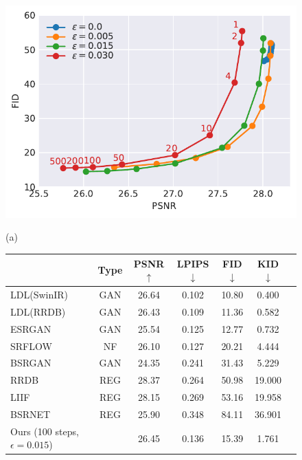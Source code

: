 

\begin{figure}[ht]

\begin{minipage}[c]{.38\linewidth}
\centering
    \includegraphics[width=\linewidth, clip=true, trim=5 0 0 0]{assets/pd_curve_sisrx4_fid_noise.pdf}\vspace{-.3em}

(a)
\end{minipage}
\begin{minipage}[c]{.61\linewidth}
\small
\centering
\setlength{\tabcolsep}{1pt}
\begin{tabular}{lcccccr}
\toprule
& Type & PSNR$\uparrow$ & LPIPS$\downarrow$ & FID$\downarrow$ & KID$\downarrow$ \\ \midrule
LDL(SwinIR)~\citep{liang2022details} & GAN	& 26.64	&	\colorbox{red!15}{0.102}	& \colorbox{red!15}{10.80} & \colorbox{red!15}{0.400} \\
LDL(RRDB)~\citep{liang2022details} & GAN &	26.43	&	\colorbox{blue!15}{0.109}	& \colorbox{blue!15}{11.36} & \colorbox{blue!15}{0.582}\\
ESRGAN~\citep{wang2018esrgan}	& GAN & 25.54	&	0.125	& 12.77 & 0.732	 \\
SRFLOW~\citep{lugmayr2020srflow}& NF	& 26.10	&	0.127	& 20.21 & 4.444 \\
BSRGAN~\citep{zhang2021designing}& GAN	& 24.35	&	0.241	& 31.43 & 5.229	\\
RRDB~\citep{wang2018esrgan}	& REG & \colorbox{red!15}{28.37}	&	0.264	& 50.98 & 19.000 \\
LIIF~\citep{chen2021learning}& REG	& \colorbox{blue!15}{28.15}	&	0.269	& 53.16 & 19.958 \\
BSRNET~\citep{zhang2021designing}& REG	& 25.90	&	0.348	& 84.11 & 36.901 \\
Ours (100 steps, $ \epsilon=0.015$)	&	& 26.45	& 0.136	& 15.39	& 1.761  \\
\bottomrule
\end{tabular}
\vspace{.2em}


\end{minipage}
\end{figure}
